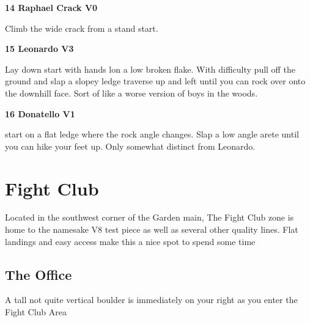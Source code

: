 \begin{multicols*}{2}

					\label{rt:Raphael Crack}\colorbox{green!20}{\textbf{14 Raphael Crack V0   }}
					\begin{adjustwidth}{0.5cm}{}
					\begin{minipage}{\linewidth}					
					Climb the wide crack from a stand start.
					\end{minipage}
					\end{adjustwidth}
					\label{rt:Leonardo}\colorbox{green!20}{\textbf{15 Leonardo V3   }}
					\begin{adjustwidth}{0.5cm}{}
					\begin{minipage}{\linewidth}					
					Lay down start with hands lon a low broken flake. With difficulty pull off the ground and slap a slopey ledge traverse up and left until you can rock over onto the downhill face. Sort of like a worse version of boys in the woods.
					\end{minipage}
					\end{adjustwidth}
					\label{rt:Donatello}\colorbox{green!20}{\textbf{16 Donatello V1   }}
					\begin{adjustwidth}{0.5cm}{}
					\begin{minipage}{\linewidth}					
					start on a flat ledge where the rock angle changes. Slap a low angle arete until you can hike your feet up. Only somewhat distinct from Leonardo.
					\end{minipage}
					\end{adjustwidth}
		\section{Fight Club}\label{sa:Fight Club}
	\begin{minipage}{\columnwidth}
	Located in the southwest corner of the Garden main, The Fight Club zone is home to the namesake V8 test piece as well as several other quality lines. Flat landings and easy access make this a nice spot to spend some time
	\end{minipage}

			\subsection*{The Office}\label{bf:The Office}
			\begin{minipage}{\columnwidth}
			A tall not quite vertical boulder is immediately on your right as you enter the Fight Club Area
			\end{minipage}
			

\end{multicols*}
